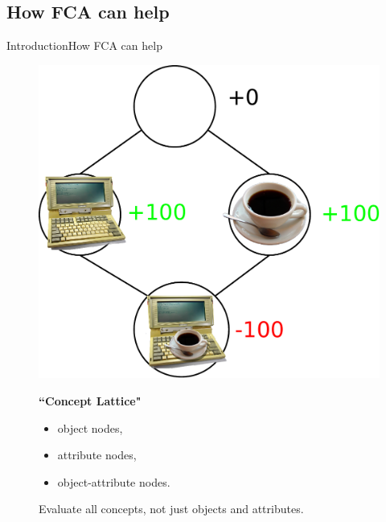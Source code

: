 \subsection{How FCA can help}
\begin{frame}{Introduction}{How FCA can help}

\begin{figure}[ht]
\begin{minipage}[t]{0.55\linewidth}
\vspace{0pt}
\centering
\includegraphics[width=\textwidth]{img/introduction/fca_coffee.pdf}
\end{minipage}
\hfill
\begin{minipage}[t]{0.40\linewidth}
\vspace{0pt}
\textbf{``Concept Lattice"}
\begin{itemize}
\item object nodes,
\item attribute nodes,
\item object-attribute nodes.
\end{itemize}
\vspace{0.4cm}
Evaluate all concepts, not just objects and attributes.
\end{minipage}
\end{figure}

\end{frame}